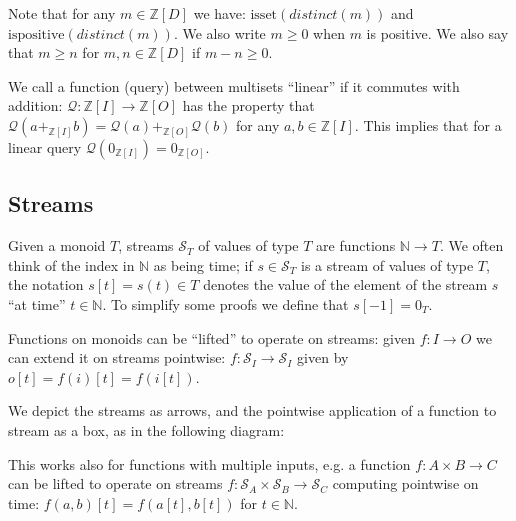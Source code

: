 \documentclass[10pt]{article}
\newcommand{\Z}{\mathbb{Z}}  %
\newcommand{\N}{\mathbb{N}}  %
\newcommand{\stream}[1]{\ensuremath{\mathcal{S}_{#1}}}
\newcommand{\distinct}{\mathit{distinct}}  %
\newcommand{\q}{\ensuremath{\mathcal{Q}}}  %
\newcommand{\isset}{\mbox{isset}}
\newcommand{\ispositive}{\mbox{ispositive}}
\begin{document}
Note that for any $m \in \Z[D]$ we have: $\isset(\distinct(m))$
and $\ispositive(\distinct(m))$.  We also write $m \geq 0$ when
$m$ is positive.  We also say that $m \geq n$ for $m, n \in \Z[D]$ if
$m - n \geq 0$.

We call a function (query) between multisets ``linear'' if it commutes
with addition: $\q: \Z[I] \rightarrow \Z[O]$ has the property that
$\q(a +_{\Z[I]} b) = \q(a) +_{\Z[O]} \q(b)$ for any $a, b \in \Z[I]$.
This implies that for a linear query $\q(0_{\Z[I]}) = 0_{\Z[O]}$.

\subsection{Streams}

Given a monoid $T$, streams $\stream{T}$ of values of type $T$ are
functions $\N \rightarrow T$.  We often think of the index in $\N$ as
being time; if $s \in \stream{T}$ is a stream of values of type $T$,
the notation $s[t] = s(t) \in T$ denotes the value of the element of
the stream $s$ ``at time'' $t \in \N$.  To simplify some proofs we
define that $s[-1] = 0_T$.

Functions on monoids can be ``lifted'' to operate on streams: given
$f: I \rightarrow O$ we can extend it on streams pointwise: $f :
\stream{I} \rightarrow \stream{I}$ given by $o[t] = f(i)[t] = f(i[t])$.

We depict the streams as arrows, and the pointwise application of a
function to stream as a box, as in the following diagram:


This works also for functions with multiple inputs, e.g.  a function
$f: A \times B \rightarrow C$ can be lifted to operate on streams $f:
\stream{A} \times \stream{B} \rightarrow \stream{C}$ computing
pointwise on time: $f(a, b)[t] = f(a[t], b[t])$ for $t \in \N$.

\end{document}
